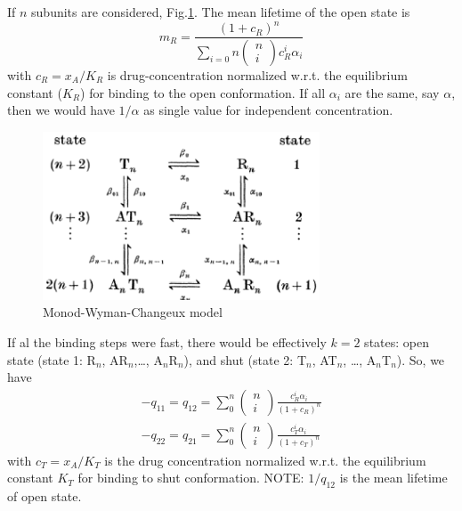 If $n$ subunits are considered, Fig.\ref{fig:MWC_model}. The mean lifetime of
the open state is
\begin{equation}
m_R = \frac{(1+c_R)^n}{\sum_{i=0}{n}\left(\begin{array}{c} n \\ i
\end{array}\right) c^i_R\alpha_i }
\end{equation}
with $c_R=x_A/K_R$ is drug-concentration normalized w.r.t. the equilibrium
constant ($K_R$) for binding to the open conformation. If all $\alpha_i$ are the
same, say $\alpha$, then we would have $1/\alpha$ as single value for
independent concentration.

 \begin{figure}[hbt]
 \centerline{\includegraphics[height=5cm]{./images/MWC_model2.eps}}
\caption{Monod-Wyman-Changeux model}
\label{fig:MWC_model}
\end{figure}

If al the binding steps were fast, there would be effectively $k=2$ states: open
state (state 1: R$_n$, AR$_n$,\ldots, A$_n$R$_n$), and shut (state 2: T$_n$,
AT$_n$, \ldots, A$_n$T$_n$). So, we have
\begin{equation}
\begin{split}
-q_{11} = q_{12} = \sum_{0}^n \left(\begin{array}{c} n \\ i
\end{array}\right) \frac{c^i_R\alpha_i}{(1+c_R)^n} \\
-q_{22} = q_{21} = \sum_{0}^n \left(\begin{array}{c} n \\ i
\end{array}\right) \frac{c^i_T\alpha_i}{(1+c_T)^n}
\end{split}
\end{equation}
with $c_T = x_A/K_T$ is the drug concentration normalized w.r.t. the equilibrium
constant $K_T$ for binding to shut conformation. NOTE: $1/q_{12}$ is the mean
lifetime of open state.

